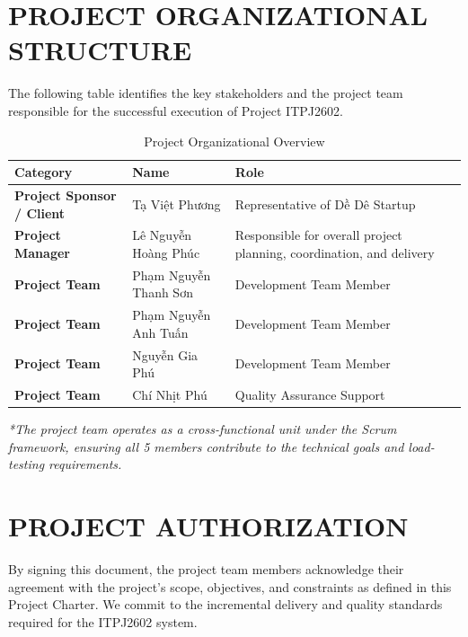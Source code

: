 \chapter{PROJECT ORGANIZATIONAL STRUCTURE}

The following table identifies the key stakeholders and the project team responsible for the successful execution of Project ITPJ2602.

\noindent
\begin{table}[H]
\begin{tabularx}{\textwidth}{|l|Y|Y|}
\hline
{} \textbf{Category} & \textbf{Name} & \textbf{Role} \\ \hline

\textbf{Project Sponsor / Client} 
& Tạ Việt Phương 
& Representative of Dề Dê Startup \\ \hline

\textbf{Project Manager} 
& Lê Nguyễn Hoàng Phúc 
& Responsible for overall project planning, coordination, and delivery \\ \hline

\textbf{Project Team} 
& Phạm Nguyễn Thanh Sơn 
& Development Team Member \\ \hline

\textbf{Project Team} 
& Phạm Nguyễn Anh Tuấn 
& Development Team Member \\ \hline

\textbf{Project Team} 
& Nguyễn Gia Phú 
& Development Team Member \\ \hline

\textbf{Project Team} 
& Chí Nhịt Phú 
& Quality Assurance Support \\ \hline

\end{tabularx}
\caption{Project Organizational Overview}
\end{table}

\vspace{1cm}
\textit{*The project team operates as a cross-functional unit under the Scrum framework, ensuring all 5 members contribute to the technical goals and load-testing requirements.}

\chapter{PROJECT AUTHORIZATION}

By signing this document, the project team members acknowledge their agreement with the project’s scope, objectives, and constraints as defined in this Project Charter. We commit to the incremental delivery and quality standards required for the ITPJ2602 system.

